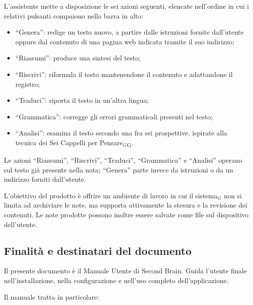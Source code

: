 \documentclass[a4paper, 10pt]{article}
\begin{document}
L'assistente mette a disposizione le sei azioni seguenti, elencate nell'ordine in cui i relativi pulsanti compaiono nella barra in alto:

\begin{itemize}
    \item ``Genera'': redige un testo nuovo, a partire dalle istruzioni fornite dall'utente oppure dal contenuto di una pagina web indicata tramite il suo indirizzo;

    \item ``Riassumi'': produce una sintesi del testo;

    \item ``Riscrivi'': riformula il testo mantenendone il contenuto e adattandone il registro;

    \item ``Traduci'': riporta il testo in un'altra lingua;

    \item ``Grammatica'': corregge gli errori grammaticali presenti nel testo;

    \item ``Analisi'': esamina il testo secondo una fra sei prospettive, ispirate alla tecnica dei Sei Cappelli per Pensare$_G$\textsubscript{G}.
\end{itemize}

Le azioni ``Riassumi'', ``Riscrivi'', ``Traduci'', ``Grammatica'' e ``Analisi'' operano sul testo già presente nella nota; ``Genera'' parte invece da istruzioni o da un indirizzo forniti dall'utente.

L'obiettivo del prodotto è offrire un ambiente di lavoro in cui il sistema$_G$ non si limita ad archiviare le note, ma supporta attivamente la stesura e la revisione dei contenuti. Le note prodotte possono inoltre essere salvate come file sul dispositivo dell'utente.

\subsection{Finalità e destinatari del documento}
\label{sec:finalita-destinatari}
Il presente documento è il Manuale Utente di Second Brain. Guida l'utente finale nell'installazione, nella configurazione e nell'uso completo dell'applicazione.

Il manuale tratta in particolare:
\end{document}
